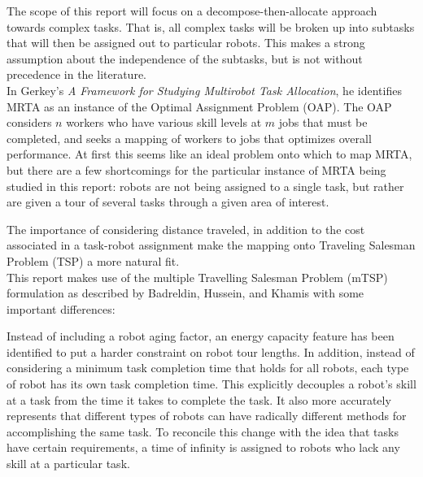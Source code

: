 \documentclass[a4paper]{article}
\begin{document}
The scope of this report will focus on a decompose-then-allocate approach towards complex tasks. That is, all complex tasks will be broken up into subtasks that will then be assigned out to particular robots. This makes a strong assumption about the independence of the subtasks, but is not without precedence in the literature.\cite{Khamis}\\

In Gerkey's \textit{A Framework for Studying Multirobot Task Allocation}\cite{Gerkey}, he identifies MRTA as an instance of the Optimal Assignment Problem (OAP). The OAP considers $n$ workers who have various skill levels at $m$ jobs that must be completed, and seeks a mapping of workers to jobs that optimizes overall performance. At first this seems like an ideal problem onto which to map MRTA, but there are a few shortcomings for the particular instance of MRTA being studied in this report: robots are not being assigned to a single task, but rather are given a tour of several tasks through a given area of interest.

The importance of considering distance traveled, in addition to the cost associated in a task-robot assignment make the mapping onto Traveling Salesman Problem (TSP) a more natural fit.\\

This report makes use of the multiple Travelling Salesman Problem (mTSP) formulation as described by Badreldin, Hussein, and Khamis with some important differences:\cite{Badreldin}

Instead of including a robot aging factor, an energy capacity feature has been identified to put a harder constraint on robot tour lengths. In addition, instead of considering a minimum task completion time that holds for all robots, each type of robot has its own task completion time. This explicitly decouples a robot's skill at a task from the time it takes to complete the task. It also more accurately represents that different types of robots can have radically different methods for accomplishing the same task. To reconcile this change with the idea that tasks have certain requirements, a time of infinity is assigned to robots who lack any skill at a particular task.

\end{document}
